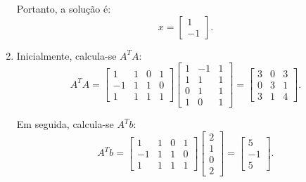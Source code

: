 \begin{resolution}
\begin{enumerate}[label=\alph*)]
          Portanto, a solução é:
          \[
            x = \begin{bmatrix}
              1 \\
              -1
            \end{bmatrix}.
          \]

    \item Inicialmente, calcula-se \( A^T A \):
          \[
            A^T A = \begin{bmatrix}
              1  & 1 & 0 & 1 \\
              -1 & 1 & 1 & 0 \\
              1  & 1 & 1 & 1
            \end{bmatrix}
            \begin{bmatrix}
              1 & -1 & 1 \\
              1 & 1  & 1 \\
              0 & 1  & 1 \\
              1 & 0  & 1
            \end{bmatrix} =
            \begin{bmatrix}
              3 & 0 & 3 \\
              0 & 3 & 1 \\
              3 & 1 & 4
            \end{bmatrix}.
          \]

          Em seguida, calcula-se \( A^T b \):
          \[
            A^T b = \begin{bmatrix}
              1  & 1 & 0 & 1 \\
              -1 & 1 & 1 & 0 \\
              1  & 1 & 1 & 1
            \end{bmatrix}
            \begin{bmatrix}
              2 \\
              1 \\
              0 \\
              2
            \end{bmatrix} =
            \begin{bmatrix}
              5  \\
              -1 \\
              5
            \end{bmatrix}.
          \]


\end{enumerate}
\end{resolution}
